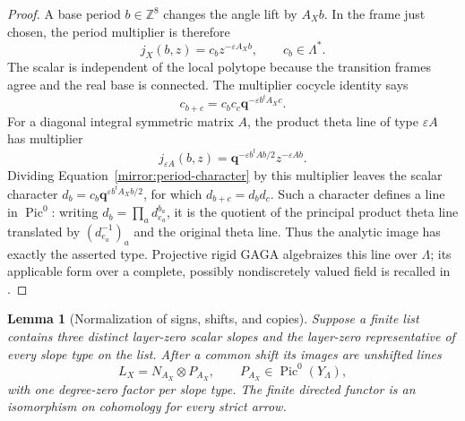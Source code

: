 \documentclass[11pt]{article}
\newtheorem{lemma}[theorem]{Lemma}
\theoremstyle{definition}
\theoremstyle{remark}
\newcommand{\Z}{\mathbb Z}
\newcommand{\qnov}{\mathbf q}
\DeclareMathOperator{\Pic}{Pic}
\numberwithin{equation}{section}
\begin{document}
\begin{proof}
A base period $b\in\Z^8$ changes the angle lift by $A_Xb$.
In the frame just chosen, the period multiplier is therefore
\begin{equation}
 j_X(b,z)=c_bz^{-\varepsilon A_Xb},\qquad c_b\in\Lambda^*.
 \label{mirror:period-character}
\end{equation}
The scalar is independent of the local polytope because the
transition frames agree and the real base is connected.  The
multiplier cocycle identity says
\[
 c_{b+c}=c_bc_c\qnov^{-\varepsilon b^tA_Xc}.
\]
For a diagonal integral symmetric matrix $A$, the product theta line
of type $\varepsilon A$ has multiplier
\[
 j_{\varepsilon A}(b,z)
   =\qnov^{-\varepsilon b^tAb/2}z^{-\varepsilon Ab}.
\]
Dividing Equation~\eqref{mirror:period-character} by this multiplier
leaves the scalar character
$d_b=c_b\qnov^{\varepsilon b^tA_Xb/2}$, for which
$d_{b+c}=d_bd_c$.  Such a character defines a line in $\Pic^0$:
writing $d_b=\prod_a d_{e_a}^{b_a}$, it is the quotient of the
principal product theta line translated by
$(d_{e_a}^{-1})_a$ and the original theta line.  Thus the analytic
image has exactly the asserted type.  Projective rigid GAGA
algebraizes this line over $\Lambda$; its applicable form over a
complete, possibly nondiscretely valued field is recalled in
\cite[p.~502]{conrad-gaga}.
\end{proof}

\begin{lemma}[Normalization of signs, shifts, and copies]
\label{mirror:normalization}
Suppose a finite list contains three distinct layer-zero scalar
slopes and the layer-zero representative of every slope type on the
list.  After a common shift its images are unshifted lines
\begin{equation}
 L_X=N_{A_X}\otimes P_{A_X},\qquad
 P_{A_X}\in\Pic^0(Y_\Lambda),
 \label{mirror:normalized-lines}
\end{equation}
with one degree-zero factor per slope type.  The finite directed
functor is an isomorphism on cohomology for every strict arrow.
\end{lemma}
\end{document}
